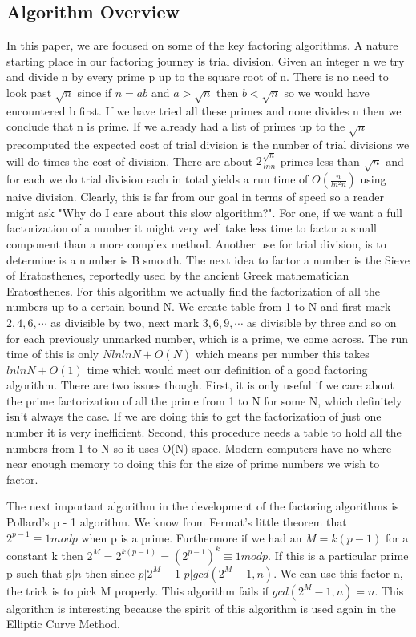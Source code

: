 \documentclass{article}
\begin{document}
\subsection{Algorithm Overview}
In this paper, we are focused on some of the key factoring algorithms. A nature starting place in our factoring journey is trial division. Given an integer n we try and divide n by every prime p up to the square root of n. There is no need to look past $\sqrt{n}$ since if $n = ab$ and $a > \sqrt{n}$ then $b < \sqrt{n}$ so we would have encountered b first. If we have tried all these primes and none divides n then we conclude that n is prime. If we already had a list of primes up to the $\sqrt{n}$ precomputed the expected cost of trial division is the number of trial divisions we will do times the cost of division. There are about $ 2 \frac{\sqrt{n}}{ln n}$ primes less than $\sqrt{n}$ and for each we do trial division each in total yields a run time of $O(\frac{n}{ln^2 n})$ using naive division. Clearly, this is far from our goal in terms of speed so a reader might ask "Why do I care about this slow algorithm?". For one, if we want a full factorization of a number it might very well take less time to factor a small component than a more complex method. Another use for trial division, is to determine is a number is B smooth. 
The next idea to factor a number is the Sieve of Eratosthenes, reportedly used by the ancient Greek mathematician Eratosthenes. For this algorithm we actually find the factorization of all the numbers up to a certain bound N. We create table from 1 to N and first mark $2, 4, 6, \cdots $ as divisible by two, next mark $3, 6, 9, \cdots$ as divisible by three and so on for each previously unmarked number, which is a prime,  we come across. The run time of this is only $N ln ln N +  O(N)$ which means per number this takes $ln ln N + O ( 1 )$ time which would meet our definition of a good factoring algorithm. There are two issues though. First, it is only useful if we care about the prime factorization of all the prime from 1 to N for some N, which definitely isn't always the case. If we are doing this to get the factorization of just one number it is very inefficient. Second, this procedure needs a table to hold all the numbers from 1 to N so it uses O(N) space. Modern computers have no where near enough memory to doing this for the size of prime numbers we wish to factor. 


The next important algorithm in the development of the factoring algorithms is Pollard's p - 1 algorithm.  We know from Fermat's little theorem that $2^{p-1} \equiv 1 mod p$ when p is a prime. Furthermore  if we had an $M = k ( p - 1 ) $ for a constant k then $2^M = 2^{ k  ( p - 1 ) } = ( 2^{ p -1 } ) ^ k \equiv 1 mod p$. If this is a particular prime p such that $p | n$ then since $ p | 2^M - 1 $ $ p | gcd ( 2^M - 1 , n )$. We can use this factor n, the trick is to pick M properly. This algorithm fails if $gcd ( 2^M - 1 , n )  = n$. This algorithm is interesting because the spirit of this algorithm is used again in the Elliptic Curve Method. 
\end{document}
